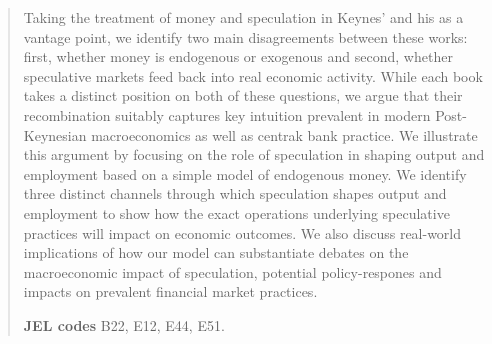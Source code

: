 \begin{abstract}
Taking the treatment of money and speculation in Keynes' \treatise{} and his \GT{} as a vantage point, we identify two main disagreements between these works: first, whether money is endogenous or exogenous and second, whether speculative markets feed back into real economic activity. While each book takes a distinct position on both of these questions, we argue that their recombination suitably captures key intuition prevalent in modern Post-Keynesian macroeconomics as well as centrak bank practice. We illustrate this argument by focusing on the role of speculation in shaping output and employment based on a simple model of endogenous money. We identify three distinct channels through which speculation shapes output and employment to show how the exact operations underlying speculative practices will impact on economic outcomes. We also discuss real-world implications of how our model can substantiate debates on the macroeconomic impact of speculation, potential policy-respones and impacts on prevalent financial market practices.

\noindent\textbf{JEL codes} B22, E12, E44, E51.
\end{abstract}
